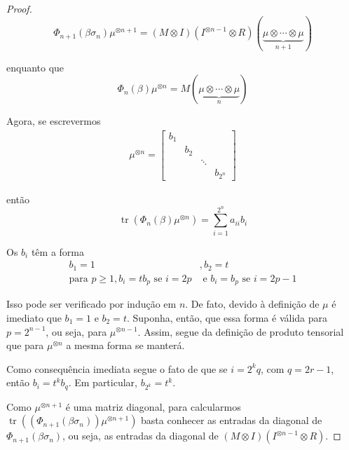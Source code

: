 \documentclass[a4paper,portuguese,11pt,twoside, leqno]{book}
\DeclareMathOperator{\tr}{tr}
\theoremstyle{definition}
\begin{document}
\begin{proof}
		\begin{equation*}
		\Phi_{n+1}(\beta\sigma_n)\mu^{\otimes n+1} = (M\otimes I)(I^{\otimes n-1}\otimes R)(\underbrace{\mu\otimes\cdots\otimes\mu}_{n+1})
		\end{equation*}
		\par\vspace{0.3cm} enquanto que
		\begin{equation*}
		\Phi_n(\beta)\mu^{\otimes n} = M(\underbrace{\mu\otimes\cdots\otimes\mu}_{n})
		\end{equation*}
		\par\vspace{0.3cm} Agora, se escrevermos 
		\begin{align*}
		\mu^{\otimes n} = \begin{bmatrix}
		b_1 \\
		& b_2 \\
		& & \ddots \\
		& & & b_{2^n}
		\end{bmatrix}
		\end{align*}
		\par\vspace{0.3cm} então 
		\begin{equation*}
		\tr(\Phi_n(\beta)\mu^{\otimes n}) = \sum_{i=1}^{2^n}a_{ii}b_i
		\end{equation*}
		\par\vspace{0.3cm} Os $b_i$ têm a forma
		\begin{align*}
		b_1 = 1&, b_2 = t \\
		\text{para }p\geq 1, b_i = tb_p \text{ se }i=2p &\text{ e } b_i = b_p \text{ se }i=2p-1 
		\end{align*}
		\par\vspace{0.3cm} Isso pode ser verificado por indução em $n$. De fato, devido à definição de $\mu$ é imediato que $b_1 = 1$ e $b_2 = t$. Suponha, então, que essa forma é válida para $p = 2^{n-1}$, ou seja, para $\mu^{\otimes n-1 }$. Assim, segue da definição de produto tensorial que para $\mu^{\otimes n}$ a mesma forma se manterá.
		\par\vspace{0.3cm} Como consequência imediata segue o fato de que se $i = 2^kq$, com $q =2r - 1$, então $b_i = t^kb_q$. Em particular, $b_{2^k} = t^k$.
		\par\vspace{0.3cm} Como $\mu^{\otimes n+1}$ é uma matriz diagonal, para calcularmos $\tr( (\Phi_{n+1}(\beta\sigma_n))\mu^{\otimes n+1} )$ basta conhecer as entradas da diagonal de $\Phi_{n+1}(\beta\sigma_n)$, ou seja, as entradas da diagonal de $(M\otimes I)(I^{\otimes n-1}\otimes R)$. 

\end{proof}
\end{document}
